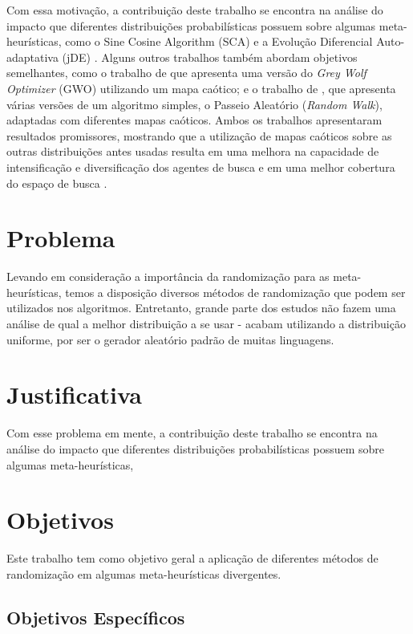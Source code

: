 Com essa motivação, a contribuição deste trabalho se encontra na análise do impacto que diferentes distribuições probabilísticas possuem sobre algumas meta-heurísticas, como o Sine Cosine Algorithm (SCA) \cite{mirjalili} e a Evolução Diferencial Auto-adaptativa (jDE) \cite{brest}. Alguns outros trabalhos também abordam objetivos semelhantes, como o trabalho de \cite{saxena} que apresenta uma versão do \textit{Grey Wolf Optimizer} (GWO) utilizando um mapa caótico; e o trabalho de \cite{jana}, que apresenta várias versões de um algoritmo simples, o Passeio Aleatório (\textit{Random Walk}), adaptadas com diferentes mapas caóticos. Ambos os trabalhos apresentaram resultados promissores, mostrando que a utilização de mapas caóticos sobre as outras distribuições antes usadas resulta em uma melhora na capacidade de intensificação e diversificação dos agentes de busca \cite{saxena} e em uma melhor cobertura do espaço de busca \cite{jana}.

\section{Problema}

Levando em consideração a importância da randomização para as meta-heurísticas, temos a disposição diversos métodos de randomização que podem ser utilizados nos algoritmos. Entretanto, grande parte dos estudos não fazem uma análise de qual a melhor distribuição a se usar - acabam utilizando a distribuição uniforme, por ser o gerador aleatório padrão de muitas linguagens.

\section{Justificativa}

Com esse problema em mente, a contribuição deste trabalho se encontra na análise do impacto que diferentes distribuições probabilísticas possuem sobre algumas meta-heurísticas,

\section{Objetivos}

Este trabalho tem como objetivo geral a aplicação de diferentes métodos de randomização em algumas meta-heurísticas divergentes.

\subsection{Objetivos Específicos}


